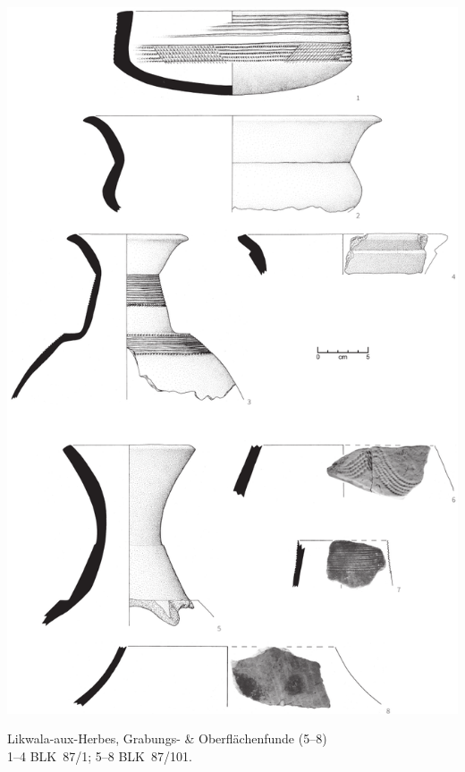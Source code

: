 \begin{pl}[H]
	\includegraphics{plt/Taf69.pdf}
	\vspace{.75em}\caption{Likwala-aux-Herbes, Grabungs- \& Oberflächenfunde (5--8) \\ 1--4 BLK~87/1; 5--8 BLK~87/101.}
	\label{pl:69}
\end{pl}

